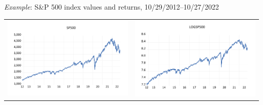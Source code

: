 \begin{frame}%
\begin{block}{\emph{Example}: S\&P 500 index values and returns, 10/29/2012--10/27/2022}
\begin{center}
\begin{tabular}{rr}
\includegraphics[height=0.3\textheight]{sp500}&\includegraphics[height=0.3\textheight]{logsp500}\\

\end{tabular}
\end{center}
\end{block}
\end{frame}
